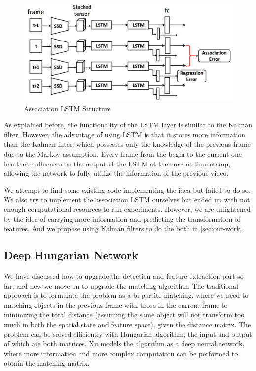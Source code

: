 \documentclass[conference]{IEEEtran}
\begin{document}
\begin{figure}[h]
    \centering
    \includegraphics[width=0.99\linewidth]{fig/assoc_lstm.png}
    \caption{Association LSTM Structure\protect\footnotemark}
    \label{fig:lstm-struct}
\end{figure}

As explained before, the functionality of the LSTM layer is similar to the Kalman filter.
However, the advantage of using LSTM is that it stores more information than the Kalman filter, which possesses only the knowledge of the previous frame due to the Markov assumption.
Every frame from the begin to the current one has their influences on the output of the LSTM at the current time stamp, allowing the network to fully utilize the information of the previous video.

We attempt to find some existing code implementing the idea but failed to do so.
We also try to implement the association LSTM ourselves but ended up with not enough computational resources to run experiments.
However, we are enlightened by the idea of carrying more information and predicting the transformation of features.
And we propose using Kalman filters to do the both in \cref{sec:our-work}.

\subsection{Deep Hungarian Network}
We have discussed how to upgrade the detection and feature extraction part so far, and now we move on to upgrade the matching algorithm.
The traditional approach is to formulate the problem as a bi-partite matching, where we need to matching objects in the previous frame with those in the current frame to minimizing the total distance (assuming the same object will not transform too much in both the spatial state and feature space), given the distance matrix.
The problem can be solved efficiently with Hungarian algorithm, the input and output of which are both matrices.
Xu \cite{xu2019deepmot} models the algorithm as a deep neural network, where more information and more complex computation can be performed to obtain the matching matrix.
\end{document}
